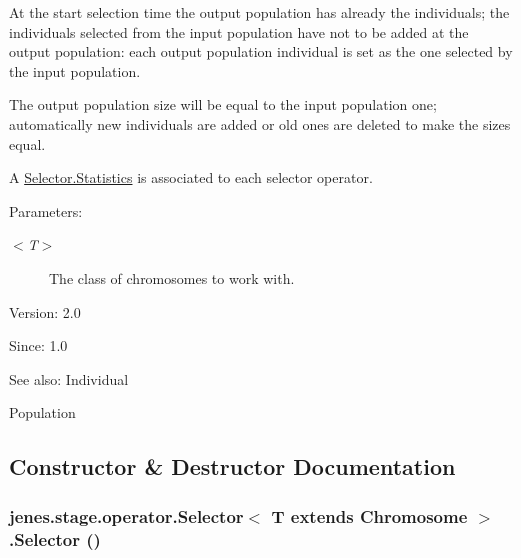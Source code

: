 At the start selection time the output population has already the individuals; the individuals selected from the input population have not to be added at the output population: each output population individual is set as the one selected by the input population. 

The output population size will be equal to the input population one; automatically new individuals are added or old ones are deleted to make the sizes equal. 

A \hyperlink{}{Selector.Statistics} is associated to each selector operator.

\begin{Desc}
\item[Parameters:]
\begin{description}
\item[{\em $<$T$>$}]The class of chromosomes to work with.\end{description}
\end{Desc}
\begin{Desc}
\item[Version:]2.0 \end{Desc}
\begin{Desc}
\item[Since:]1.0\end{Desc}
\begin{Desc}
\item[See also:]Individual 

Population \end{Desc}


\subsection{Constructor \& Destructor Documentation}
\hypertarget{classjenes_1_1stage_1_1operator_1_1_selector_3_01_t_01extends_01_chromosome_01_4_83052368d6df966944bc5178f1eebed0}{
\subsubsection[Selector]{\setlength{\rightskip}{0pt plus 5cm}jenes.stage.operator.Selector$<$ T extends Chromosome $>$.Selector ()}}
\label{classjenes_1_1stage_1_1operator_1_1_selector_3_01_t_01extends_01_chromosome_01_4_83052368d6df966944bc5178f1eebed0}


